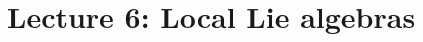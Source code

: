 % 
\section{Lecture 6: Local Lie algebras} %
\label{sec:lecture_6_local_lie_algebras}

\label{thm:symbol_squiggle}
